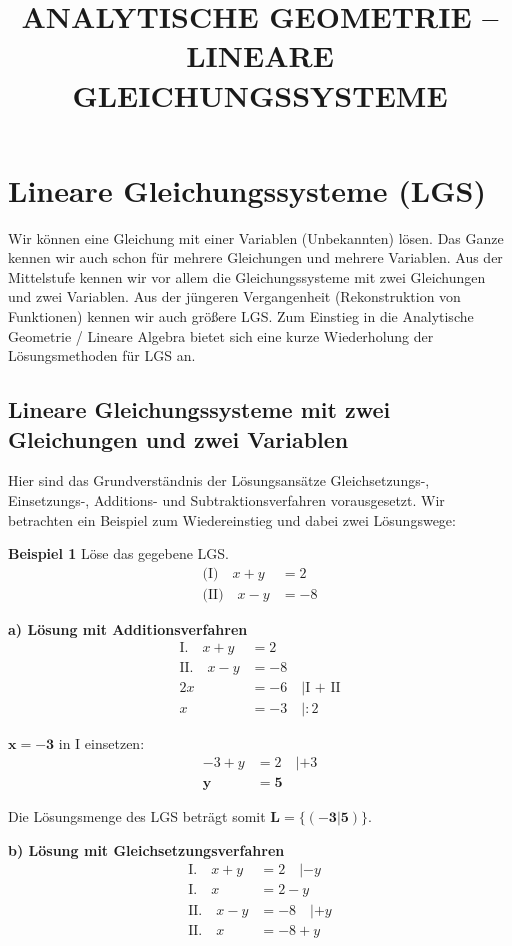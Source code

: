 \documentclass{article}
\title{ANALYTISCHE GEOMETRIE – LINEARE GLEICHUNGSSYSTEME}
\author{}
\date{}
\begin{document}
\maketitle

\section{Lineare Gleichungssysteme (LGS)}

Wir können eine Gleichung mit einer Variablen (Unbekannten) lösen. Das Ganze kennen wir auch schon für mehrere Gleichungen und mehrere Variablen. Aus der Mittelstufe kennen wir vor allem die Gleichungssysteme mit zwei Gleichungen und zwei Variablen. Aus der jüngeren Vergangenheit (Rekonstruktion von Funktionen) kennen wir auch größere LGS. Zum Einstieg in die Analytische Geometrie / Lineare Algebra bietet sich eine kurze Wiederholung der Lösungsmethoden für LGS an.

\subsection{Lineare Gleichungssysteme mit zwei Gleichungen und zwei Variablen}

Hier sind das Grundverständnis der Lösungsansätze Gleichsetzungs-, Einsetzungs-, Additions- und Subtraktionsverfahren vorausgesetzt. Wir betrachten ein Beispiel zum Wiedereinstieg und dabei zwei Lösungswege:

\textbf{Beispiel 1} Löse das gegebene LGS.
\begin{align}
\text{(I)} \quad x + y &= 2\\
\text{(II)} \quad x - y &= -8
\end{align}

\textbf{a) Lösung mit Additionsverfahren}
\begin{align}
\text{I.} \quad x + y &= 2\\
\text{II.} \quad x - y &= -8\\
\hline
2x &= -6 \quad |\text{I + II}\\
x &= -3 \quad |: 2
\end{align}

$\mathbf{x = -3}$ in I einsetzen:
\begin{align}
-3 + y &= 2 \quad |+3\\
\mathbf{y} &= \mathbf{5}
\end{align}

Die Lösungsmenge des LGS beträgt somit $\mathbf{L = \{(-3|5)\}}$.

\textbf{b) Lösung mit Gleichsetzungsverfahren}
\begin{align}
\text{I.} \quad x + y &= 2 \quad |- y\\
\text{I.} \quad x &= 2 - y\\
\text{II.} \quad x - y &= -8 \quad |+ y\\
\text{II.} \quad x &= -8 + y
\end{align}
\end{document}
